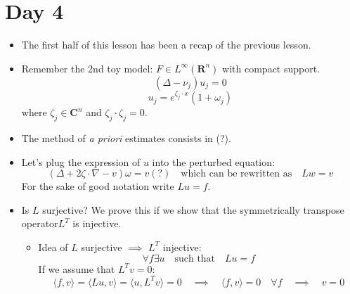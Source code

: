 \documentclass{article}
\begin{document}
\section*{Day 4}
\begin{itemize}
    \item The first half of this lesson has been a recap of the previous lesson.

    \item Remember the 2nd toy model: $F \in L^\infty (\mathbf{R}^n)$ with compact support.
    \begin{equation}
        (\Delta - \nu_j) u_j = 0
    \end{equation}
    \begin{equation}
        u_j = e^{\zeta_j \cdot x} (1 + \omega_j)
    \end{equation}
    where $ \zeta_j \in \mathbf{C}^n$ and $\zeta_j \cdot \zeta_j = 0$.

    \item The method of \textit{a priori} estimates consists in (?).

    \item Let's plug the expression of $u$ into the perturbed equation:
    \begin{equation}
        (\Delta + 2\zeta \cdot \nabla - v) \omega = v (?) \quad \text{which can be rewritten as} \quad Lw = v
    \end{equation}
    For the sake of good notation write $Lu = f$.

    \item Is $L$ surjective? We prove this if we show that the symmetrically transpose operator$L^T$ is injective.
    \begin{itemize}
        \item Idea of $L$ surjective $\implies$ $L^T$ injective:
        \begin{equation}
            \forall f \exists u \quad \text{such that} \quad Lu=f
        \end{equation}
        If we assume that $L^Tv = 0$:
        \begin{equation}
            \langle f, v \rangle = \langle Lu, v\rangle = \langle u, L^T v \rangle = 0 \quad \implies \quad \langle f, v \rangle = 0 \quad \forall f \quad \implies \quad v = 0
        \end{equation}
        

\end{itemize}
\end{itemize}
\end{document}

